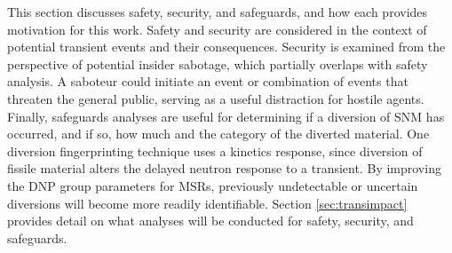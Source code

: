 This section discusses safety, security, and safeguards, and how each provides motivation for this work.
Safety and security are considered in the context of potential transient events and their consequences.
Security is examined from the perspective of potential insider sabotage, which partially overlaps with safety analysis. 
A saboteur could initiate an event or combination of events that threaten the general public, serving as a useful distraction for hostile agents.
Finally, safeguards analyses are useful for determining if a diversion of \gls{SNM} has occurred, and if so, how much and the category of the diverted material.
One diversion fingerprinting technique uses a kinetics response, since diversion of fissile material alters the delayed neutron response to a transient.
By improving the \gls{DNP} group parameters for \glspl{MSR}, previously undetectable or uncertain diversions will become more readily identifiable.
Section \ref{sec:transimpact} provides detail on what analyses will be conducted for safety, security, and safeguards.